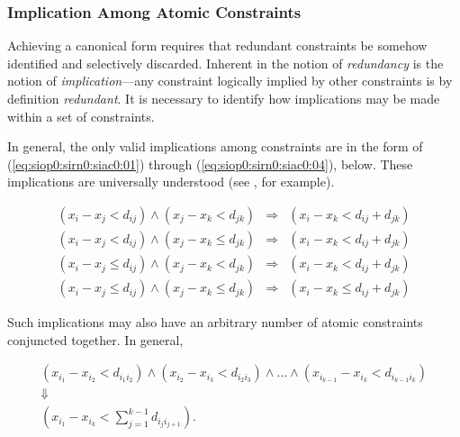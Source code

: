 \subsubsection{Implication Among Atomic Constraints}
\label{siop0:sirn0:siac0}

Achieving a canonical form requires that redundant constraints be somehow
identified and selectively discarded.  
Inherent in the notion of \emph{redundancy} is the notion
of \emph{implication}---any constraint logically implied by other constraints
is by definition \emph{redundant}.  It is necessary to identify how implications
may be made within a set of constraints.

In general, the only valid implications among constraints are in the form 
of (\ref{eq:siop0:sirn0:siac0:01}) through (\ref{eq:siop0:sirn0:siac0:04}),
below.  These implications are universally
understood (see \cite[p. 288]{bib:b:modelchecking:clark1999}, for example). 

\begin{eqnarray}
\label{eq:siop0:sirn0:siac0:01}
(x_i - x_j <    d_{ij}) \wedge (x_j - x_k <    d_{jk}) & \Longrightarrow & (x_i - x_k <    d_{ij} + d_{jk}) \\
\label{eq:siop0:sirn0:siac0:02}
(x_i - x_j <    d_{ij}) \wedge (x_j - x_k \leq d_{jk}) & \Longrightarrow & (x_i - x_k <    d_{ij} + d_{jk}) \\
\label{eq:siop0:sirn0:siac0:03}
(x_i - x_j \leq d_{ij}) \wedge (x_j - x_k <    d_{jk}) & \Longrightarrow & (x_i - x_k <    d_{ij} + d_{jk}) \\
\label{eq:siop0:sirn0:siac0:04}
(x_i - x_j \leq d_{ij}) \wedge (x_j - x_k \leq d_{jk}) & \Longrightarrow & (x_i - x_k \leq d_{ij} + d_{jk})
\end{eqnarray}

Such implications may also have an arbitrary number of atomic constraints
conjuncted together.  In general,

\begin{eqnarray}
 & (x_{i_1} - x_{i_2} < d_{i_1 i_2}) \wedge  (x_{i_2} - x_{i_3} < d_{i_2 i_3}) 
\wedge \ldots{} \wedge (x_{i_{k-1}} - x_{i_k} < d_{i_{k-1} i_k}) & \nonumber \\
\label{eq:siop0:sirn0:siac0:05}
& \Downarrow & \\
& (x_{i_{1}} - x_{i_k} < \sum_{j=1}^{k-1} d_{i_j i_{j+1}} ) . & \nonumber
\end{eqnarray}

